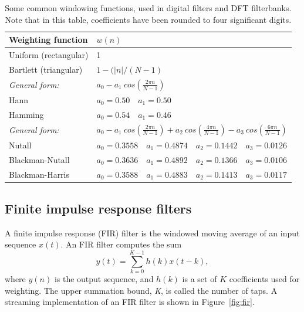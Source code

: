 \documentclass{ws-rv961x669}
\begin{document}



\begin{table}
	\caption{Some common windowing functions, used in digital filters and DFT filterbanks. Note that in this table, coefficients have been rounded to four significant digits. \label{tab:window_fns}}
	\begin{tabular}{l l }
	\hline
	Weighting function      & $w(n)$                        			\\
	\hline
	\hline
	Uniform  (rectangular)   &  1                           			\\
	Bartlett (triangular)    &  $1 - (|n| / (N-1)$               	\\
	\hline
	\emph{General form:}    & $a_0 - a_1~cos(\frac{2\pi n}{N-1})$ \\
	Hann                     & $a_0=0.50 \quad a_1 = 0.50$ 	\\
	Hamming             & $ a_0 = 0.54 \quad a_1 = 0.46$   	\\
	\hline
	
	 \emph{General form:} &$a_0 - a_1~cos(\frac{2\pi n}{N-1}) + a_2~cos(\frac{4\pi n}{N-1}) -
	 					   a_3~cos(\frac{6\pi n}{N-1}) $	 \\
	 Nutall          & $a_0=0.3558\quad a_1=0.4874\quad a_2=0.1442\quad a_3=0.0126$ \\
	 Blackman-Nutall & $a_0=0.3636\quad a_1=0.4892\quad a_2=0.1366\quad a_3=0.0106$ \\
	 Blackman-Harris & $a_0=0.3588\quad a_1=0.4883\quad a_2=0.1413\quad a_3=0.0117$ \\
	\hline
	\end{tabular}

\end{table}



\subsection{Finite impulse response filters}\label{sec:filters}

A finite impulse response (FIR) filter is the windowed moving average of an input sequence $x(t)$. An FIR filter computes the sum 
\begin{equation} 
y(t)=\sum_{k=0}^{K-1}h(k)x(t-k),\label{eq:FIR-filter}
\end{equation}
where $y(n)$ is the output sequence, and $h(k)$ is a set of $K$ coefficients used for weighting. The upper summation bound, \emph{K}, is called the number of taps.\emph{ }A streaming implementation of an FIR filter is shown in Figure~\ref{fig:fir}.
\end{document}
